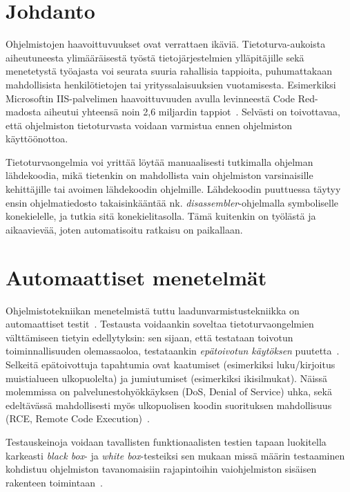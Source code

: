 \section{Johdanto}

Ohjelmistojen haavoittuvuukset ovat verrattaen ikäviä.
Tietoturva-aukoista aiheutuneesta ylimääräisestä työstä tietojärjestelmien ylläpitäjille 
sekä menetetystä työajasta voi seurata suuria rahallisia tappioita,
puhumattakaan mahdollisista henkilötietojen tai yrityssalaisuuksien vuotamisesta.
Esimerkiksi Microsoftin IIS-palvelimen haavoittuvuuden avulla levinneestä Code Red-madosta
aiheutui yhteensä noin 2,6 miljardin tappiot~\cite{CodeRed}.
Selvästi on toivottavaa, että ohjelmiston tietoturvasta voidaan varmistua ennen ohjelmiston käyttöönottoa.

Tietoturvaongelmia voi yrittää löytää manuaalisesti tutkimalla ohjelman lähdekoodia,
mikä tietenkin on mahdollista vain ohjelmiston varsinaisille kehittäjille
tai avoimen lähdekoodin ohjelmille.
Lähdekoodin puuttuessa täytyy ensin ohjelmatiedosto takaisinkääntää nk.
\emph{disassembler}-ohjelmalla symboliselle konekielelle,
ja tutkia sitä konekielitasolla.
Tämä kuitenkin on työlästä ja aikaavievää, joten automatisoitu ratkaisu on paikallaan.\fixme

\section{Automaattiset menetelmät}

Ohjelmistotekniikan menetelmistä tuttu laadunvarmistustekniikka on automaattiset testit~\cite{Sommerville}.
Testausta voidaankin soveltaa tietoturvaongelmien välttämiseen tietyin edellytyksin:
sen sijaan, että testataan toivotun toiminnallisuuden olemassaoloa,
testataankin \emph{epätoivotun käytöksen} puutetta~\cite{OuluBrowser}.
Selkeitä epätoivottuja tapahtumia ovat kaatumiset (esimerkiksi luku/kirjoitus muistialueen ulkopuolelta) ja jumiutumiset (esimerkiksi ikisilmukat).
Näissä molemmissa on palvelunestohyökkäyksen (DoS, Denial of Service) uhka,
sekä edeltävässä mahdollisesti myös ulkopuolisen koodin suorituksen mahdollisuus (RCE, Remote Code Execution)~\cite{StaticCodeAnalysis}. 

Testauskeinoja voidaan tavallisten funktionaalisten testien tapaan luokitella karkeasti \emph{black box}- ja \emph{white box}-testeiksi  sen mukaan missä määrin
testaaminen kohdistuu ohjelmiston tavanomaisiin rajapintoihin vai\fixme ohjelmiston sisäisen rakenteen toimintaan~\cite{Sommerville}.

